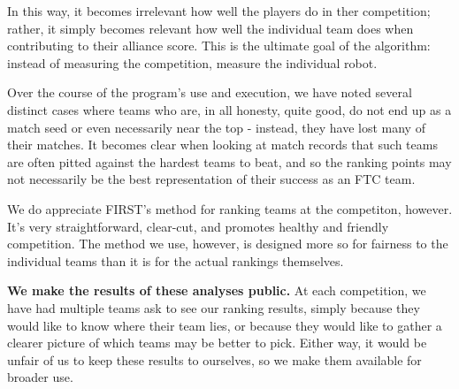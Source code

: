 In this way, it becomes irrelevant how well the players do in ther competition; rather, it simply becomes relevant how well the individual team does when contributing to their alliance score. This is the ultimate goal of the algorithm: instead of measuring the competition, measure the individual robot.

Over the course of the program's use and execution, we have noted several distinct cases where teams who are, in all honesty, quite good, do not end up as a match seed or even necessarily near the top - instead, they have lost many of their matches. It becomes clear when looking at match records that such teams are often pitted against the hardest teams to beat, and so the ranking points may not necessarily be the best representation of their success as an FTC team.

We do appreciate FIRST's method for ranking teams at the competiton, however. It's very straightforward, clear-cut, and promotes healthy and friendly competition. The method we use, however, is designed more so for fairness to the individual teams than it is for the actual rankings themselves.

\textbf{We make the results of these analyses public.} At each competition, we have had multiple teams ask to see our ranking results, simply because they would like to know where their team lies, or because they would like to gather a clearer picture of which teams may be better to pick. Either way, it would be unfair of us to keep these results to ourselves, so we make them available for broader use.